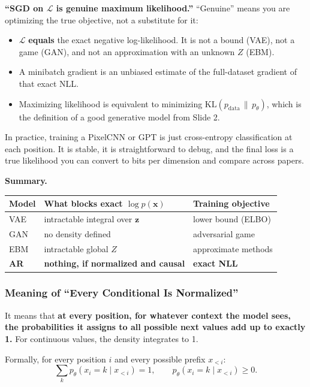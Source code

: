 \textbf{``SGD on $\mathcal{L}$ is genuine maximum likelihood.''} ``Genuine'' means you are optimizing the true objective, not a substitute for it:
\begin{itemize}
  \item $\mathcal{L}$ \textbf{equals} the exact negative log-likelihood. It is not a bound (VAE), not a game (GAN), and not an approximation with an unknown $Z$ (EBM).
  \item A minibatch gradient is an unbiased estimate of the full-dataset gradient of that exact NLL.
  \item Maximizing likelihood is equivalent to minimizing $\mathrm{KL}(p_{\text{data}} \,\|\, p_\theta)$, which is the definition of a good generative model from Slide 2.
\end{itemize}
In practice, training a PixelCNN or GPT is just cross-entropy classification at each position. It is stable, it is straightforward to debug, and the final loss is a true likelihood you can convert to bits per dimension and compare across papers.

\textbf{Summary.}
\begin{center}
\begin{tabular}{lll}
\toprule
Model & What blocks exact $\log p(\mathbf{x})$ & Training objective \\
\midrule
VAE & intractable integral over $\mathbf{z}$ & lower bound (ELBO) \\
GAN & no density defined & adversarial game \\
EBM & intractable global $Z$ & approximate methods \\
\textbf{AR} & \textbf{nothing, if normalized and causal} & \textbf{exact NLL} \\
\bottomrule
\end{tabular}
\end{center}

\subsubsection*{Meaning of ``Every Conditional Is Normalized''}

It means that \textbf{at every position, for whatever context the model sees, the probabilities it assigns to all possible next values add up to exactly 1.} For continuous values, the density integrates to 1.

Formally, for every position $i$ and every possible prefix $x_{<i}$:
$$\sum_{k} p_\theta(x_i = k \mid x_{<i}) = 1, \qquad p_\theta(x_i = k \mid x_{<i}) \ge 0.$$

